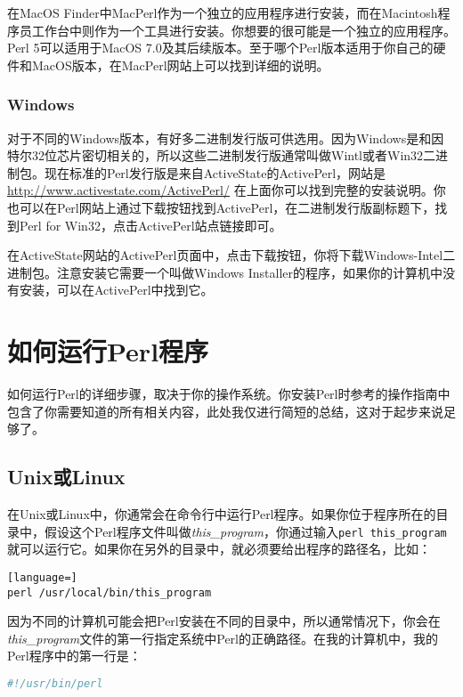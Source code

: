 在MacOS Finder中MacPerl作为一个独立的应用程序进行安装，而在Macintosh程序员工作台中则作为一个工具进行安装。你想要的很可能是一个独立的应用程序。Perl 5可以适用于MacOS 7.0及其后续版本。至于哪个Perl版本适用于你自己的硬件和MacOS版本，在MacPerl网站上可以找到详细的说明。

\subsubsection{Windows}
对于不同的Windows版本，有好多二进制发行版可供选用。因为Windows是和因特尔32位芯片密切相关的，所以这些二进制发行版通常叫做Wintl或者Win32二进制包。现在标准的Perl发行版是来自ActiveState的ActivePerl，网站是 \href{http://www.activestate.com/ActivePerl/}{http://www.activestate.com/ActivePerl/} 在上面你可以找到完整的安装说明。你也可以在Perl网站上通过下载按钮找到ActivePerl，在二进制发行版副标题下，找到Perl for Win32，点击ActivePerl站点链接即可。

在ActiveState网站的ActivePerl页面中，点击下载按钮，你将下载Windows-Intel二进制包。注意安装它需要一个叫做Windows Installer的程序，如果你的计算机中没有安装，可以在ActivePerl中找到它。

\section{如何运行Perl程序}
如何运行Perl的详细步骤，取决于你的操作系统。你安装Perl时参考的操作指南中包含了你需要知道的所有相关内容，此处我仅进行简短的总结，这对于起步来说足够了。

\subsection{Unix或Linux}
在Unix或Linux中，你通常会在命令行中运行Perl程序。如果你位于程序所在的目录中，假设这个Perl程序文件叫做\textit{this\_program}，你通过输入\verb|perl this_program|就可以运行它。如果你在另外的目录中，就必须要给出程序的路径名，比如：

\begin{lstlisting}[language=]
perl /usr/local/bin/this_program
\end{lstlisting}

因为不同的计算机可能会把Perl安装在不同的目录中，所以通常情况下，你会在\textit{this\_program}文件的第一行指定系统中Perl的正确路径。在我的计算机中，我的Perl程序中的第一行是：

\begin{lstlisting}[language=bash]
#!/usr/bin/perl
\end{lstlisting}

